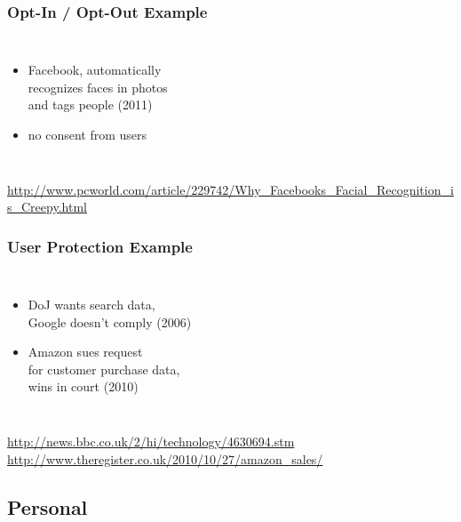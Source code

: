 \documentclass[dvipsnames]{beamer}
\theoremstyle{plain}
\begin{document}
\begin{frame}
  \frametitle{Opt-In / Opt-Out Example}

  \begin{columns}

    \begin{itemize}
      \item Facebook, automatically\\
        recognizes faces in photos\\
        and tags people (2011)
      \item no consent from users
    \end{itemize}
  \end{columns}

  \medskip
  \tiny{\url{http://www.pcworld.com/article/229742/Why_Facebooks_Facial_Recognition_is_Creepy.html}}\\
\end{frame}

\begin{frame}
  \frametitle{User Protection Example}

  \begin{columns}

    \begin{itemize}
      \item DoJ wants search data,\\
        Google doesn't comply (2006)

      \pause
      \medskip
      \item Amazon sues request\\
        for customer purchase data,\\
        wins in court (2010)
    \end{itemize}
  \end{columns}

  \medskip
  \tiny{\url{http://news.bbc.co.uk/2/hi/technology/4630694.stm}}\\
  \smallskip
  \tiny{\url{http://www.theregister.co.uk/2010/10/27/amazon_sales/}}\\
\end{frame}

\subsection{Personal}
\end{document}
